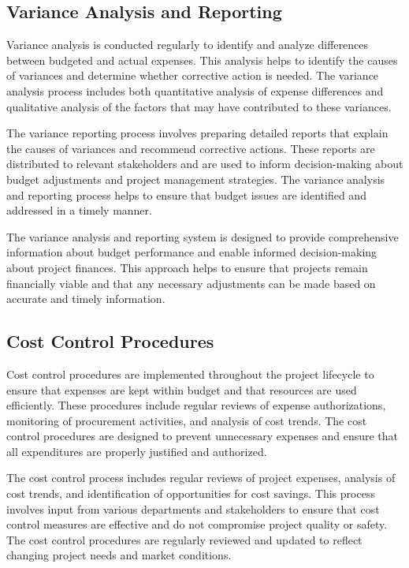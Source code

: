 \subsection{Variance Analysis and Reporting}
Variance analysis is conducted regularly to identify and analyze differences between budgeted and actual expenses. This analysis helps to identify the causes of variances and determine whether corrective action is needed. The variance analysis process includes both quantitative analysis of expense differences and qualitative analysis of the factors that may have contributed to these variances.

The variance reporting process involves preparing detailed reports that explain the causes of variances and recommend corrective actions. These reports are distributed to relevant stakeholders and are used to inform decision-making about budget adjustments and project management strategies. The variance analysis and reporting process helps to ensure that budget issues are identified and addressed in a timely manner.

The variance analysis and reporting system is designed to provide comprehensive information about budget performance and enable informed decision-making about project finances. This approach helps to ensure that projects remain financially viable and that any necessary adjustments can be made based on accurate and timely information.

\subsection{Cost Control Procedures}
Cost control procedures are implemented throughout the project lifecycle to ensure that expenses are kept within budget and that resources are used efficiently. These procedures include regular reviews of expense authorizations, monitoring of procurement activities, and analysis of cost trends. The cost control procedures are designed to prevent unnecessary expenses and ensure that all expenditures are properly justified and authorized.

The cost control process includes regular reviews of project expenses, analysis of cost trends, and identification of opportunities for cost savings. This process involves input from various departments and stakeholders to ensure that cost control measures are effective and do not compromise project quality or safety. The cost control procedures are regularly reviewed and updated to reflect changing project needs and market conditions.

